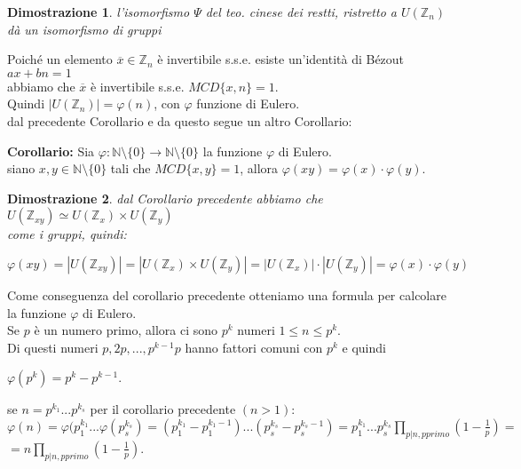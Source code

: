 \documentclass[a4paper,12pt]{article}
\theoremstyle{def}
\theoremstyle{prop}
\theoremstyle{esempio}
\theoremstyle{dimostrazione}
\newtheorem*{dimostrazione}{Dimostrazione}
\theoremstyle{teo}
\theoremstyle{osservazione}
\begin{document}
\begin{dimostrazione}
    l'isomorfismo \(\Psi\) del teo. cinese dei restti, ristretto a \(U(\mathbb{Z}_n)\) dà un isomorfismo di gruppi\\
\end{dimostrazione}

Poiché un elemento \(\overline{x} \in \mathbb{Z}_n\) è invertibile s.s.e. esiste un'identità di Bézout \(ax + bn = 1\)\\
abbiamo che \(\overline{x}\) è invertibile s.s.e. \(MCD\{x,n\} = 1\).\\
Quindi \(|U(\mathbb{Z}_n)| = \varphi(n)\), con \(\varphi\) funzione di Eulero.\\

dal precedente Corollario e da questo segue un altro Corollario:

\textbf{Corollario:} Sia \(\varphi : \mathbb{N} \setminus \{0\} \rightarrow \mathbb{N} \setminus \{0\}\) la funzione \(\varphi\) di Eulero.\\
siano \(x,y \in \mathbb{N} \setminus \{0\}\) tali che \(MCD\{x,y\} = 1\), allora \(\varphi(xy) = \varphi(x) \cdot \varphi(y)\).\\

\begin{dimostrazione}
    dal Corollario precedente abbiamo che \(U(\mathbb{Z}_{xy}) \simeq U(\mathbb{Z}_x) \times U(\mathbb{Z}_y)\)\\
    come i gruppi, quindi:
    \begin{center}
        \(\varphi(xy) = |U(\mathbb{Z}_{xy})| = |U(\mathbb{Z}_x) \times U(\mathbb{Z}_y)| = |U(\mathbb{Z}_x)| \cdot |U(\mathbb{Z}_y)| = \varphi(x) \cdot \varphi(y)\)
    \end{center}
\end{dimostrazione}
\newpage

Come conseguenza del corollario precedente otteniamo una formula per calcolare \\
la funzione \(\varphi\) di Eulero.\\
Se \(p\) è un numero primo, allora ci sono \(p^k\) numeri \(1 \leq n \leq p^k\).\\
Di questi numeri \(p, 2p, ... , p^{k-1}p\) hanno fattori comuni con \(p^k\) e quindi
\begin{center}
    \(\varphi(p^k) = p^k - p^{k-1}\).\\
\end{center}
se \(n = p^{k_1}...p^{k_s}\) per il corollario precedente \((n>1)\):\\
\(\varphi(n)= \varphi(p_1^{k_1}...\varphi(p_s^{k_s}) = (p_1^{k_1}-p_1^{k_1-1})...(p_s^{k_s}-p_s^{k_s-1}) = p_1^{k_1}...p_s^{k_s}\prod_{p|n, p primo}(1-\frac{1}{p}) = \)\\
\(= n \prod_{p|n, p primo}(1-\frac{1}{p})\).\\
\end{document}
